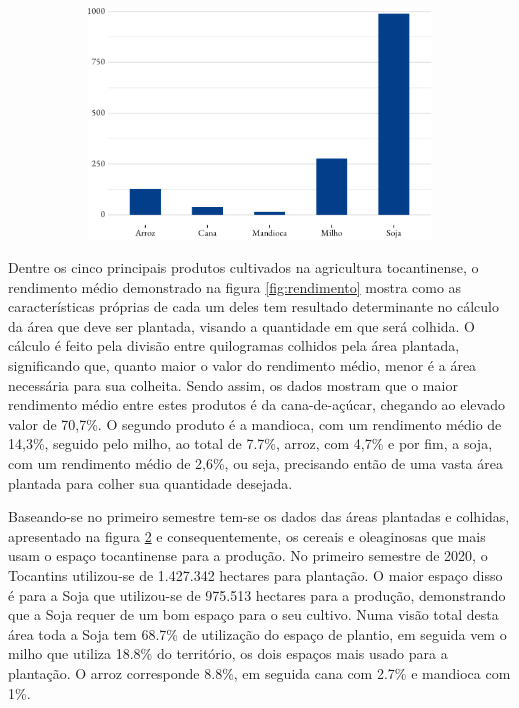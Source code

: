 \begin{figure}[!h]
\begin{subfigure}{\linewidth}
		\includegraphics{fig/area_plantada-1.pdf}
		\label{fig:areaplantada}
	\end{subfigure}
\end{figure}

\par Dentre os cinco principais produtos cultivados na agricultura tocantinense, o rendimento médio demonstrado na figura \ref{fig:rendimento} mostra como as características próprias de cada um deles tem resultado determinante no cálculo da área que deve ser plantada, visando a quantidade em que será colhida. O cálculo é feito pela divisão entre quilogramas colhidos pela área plantada, significando que, quanto maior o valor do rendimento médio, menor é a área necessária para sua colheita. Sendo assim, os dados mostram que o maior rendimento médio entre estes produtos é da cana-de-açúcar, chegando ao elevado valor de 70,7\%. O segundo produto é a mandioca, com um rendimento médio de 14,3\%, seguido pelo milho, ao total de 7.7\%, arroz, com 4,7\% e por fim, a soja, com um rendimento médio de 2,6\%, ou seja, precisando então de uma vasta área plantada para colher sua quantidade desejada.


\par Baseando-se no primeiro semestre tem-se os dados das áreas plantadas e colhidas, apresentado na figura \ref{fig:areaplantada} e consequentemente, os cereais e oleaginosas que mais usam o espaço tocantinense para a produção. No primeiro semestre de 2020, o Tocantins utilizou-se de 1.427.342 hectares para plantação. O maior espaço disso é para a Soja que utilizou-se de 975.513 hectares para a produção, demonstrando que a Soja requer de um bom espaço para o seu cultivo. Numa visão total desta área toda a Soja tem 68.7\% de utilização do espaço de plantio, em seguida vem o milho que utiliza 18.8\% do território, os dois espaços mais usado para a plantação. O arroz corresponde 8.8\%, em seguida cana com 2.7\% e mandioca com 1\%.


